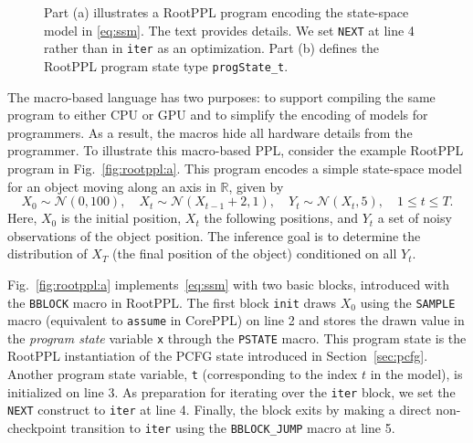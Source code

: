 \documentclass[runningheads]{llncs}
\newcommand{\rlstinline}{\lstinline[language=RootPPL]}
\newcommand{\clstinline}{\lstinline[language=CorePPL]}
\begin{document}
\begin{figure}[tb]
  \caption{%
    Part (a) illustrates a RootPPL program encoding the state-space model in \eqref{eq:ssm}.
    The text provides details.
    We set \rlstinline!NEXT! at line 4 rather than in \rlstinline!iter! as an optimization.
    Part (b) defines the RootPPL program state type \lstinline!progState_t!.
  }
  \label{fig:rootppl}
\end{figure}

The macro-based language has two purposes: to support compiling the same program to either CPU or GPU and to simplify the encoding of models for programmers.
As a result, the macros hide all hardware details from the programmer.
To illustrate this macro-based PPL, consider the example RootPPL program in Fig.~\ref{fig:rootppl:a}.
This program encodes a simple state-space model for an object moving along an axis in $\mathbb{R}$, given by
\begin{equation}\label{eq:ssm}
  X_0 \sim \mathcal{N}(0,100), \quad
  X_t \sim \mathcal{N}(X_{t-1} + 2, 1), \quad
  Y_t \sim \mathcal{N}(X_t, 5), \quad
  1 \leq t \leq T.
\end{equation}
Here, $X_0$ is the initial position, $X_t$ the following positions, and $Y_t$ a set of noisy observations of the object position.
The inference goal is to determine the distribution of $X_T$ (the final position of the object) conditioned on all $Y_t$.

Fig.~\ref{fig:rootppl:a} implements~\eqref{eq:ssm} with two basic blocks, introduced with the \rlstinline!BBLOCK! macro in RootPPL.
The first block \lstinline!init! draws $X_0$ using the \rlstinline!SAMPLE! macro (equivalent to \clstinline!assume! in CorePPL) on line 2 and stores the drawn value in the \emph{program state} variable \lstinline!x! through the \rlstinline!PSTATE! macro.
This program state is the RootPPL instantiation of the PCFG state introduced in Section~\ref{sec:pcfg}.
Another program state variable, \lstinline!t! (corresponding to the index $t$ in the model), is initialized on line 3.
As preparation for iterating over the \lstinline!iter! block, we set the \rlstinline!NEXT! construct to \lstinline!iter! at line 4.
Finally, the block exits by making a direct non-checkpoint transition to \rlstinline!iter! using the \rlstinline!BBLOCK_JUMP! macro at line 5.
\end{document}

